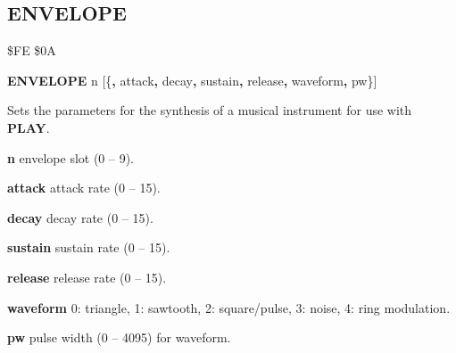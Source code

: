 
\newpage
\subsection{ENVELOPE}
\begin{description}[leftmargin=2cm,style=nextline]
\item [Token:] \$FE \$0A
\item [Format:] {\bf ENVELOPE} n [\{{\bf,} attack{\bf,} decay{\bf,}
		sustain{\bf,} release{\bf,} waveform{\bf,} pw\}]
\item [Usage:] Sets the parameters for the synthesis of a musical
               instrument for use with {\bf PLAY}.

      {\bf n} envelope slot (0 -- 9).

      {\bf attack} attack rate (0 -- 15).

      {\bf decay} decay rate (0 -- 15).

      {\bf sustain} sustain rate (0 -- 15).

      {\bf release} release rate (0 -- 15).

      {\bf waveform} 0: triangle, 1: sawtooth, 2: square/pulse, 3: noise, 4: ring modulation.

      {\bf pw} pulse width (0 -- 4095) for waveform.


\end{description}
